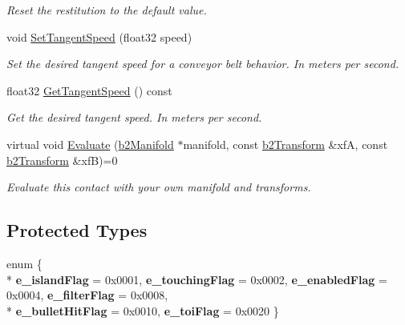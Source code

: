 \begin{DoxyCompactItemize}
\begin{DoxyCompactList}\small\item\em Reset the restitution to the default value. \end{DoxyCompactList}\item 
void \hyperlink{classb2_contact_a32033914a6c7f35b469e8fddbc17c566}{Set\+Tangent\+Speed} (float32 speed)\hypertarget{classb2_contact_a32033914a6c7f35b469e8fddbc17c566}{}\label{classb2_contact_a32033914a6c7f35b469e8fddbc17c566}

\begin{DoxyCompactList}\small\item\em Set the desired tangent speed for a conveyor belt behavior. In meters per second. \end{DoxyCompactList}\item 
float32 \hyperlink{classb2_contact_a961417ed0d43706ee8a39c396d5e6002}{Get\+Tangent\+Speed} () const \hypertarget{classb2_contact_a961417ed0d43706ee8a39c396d5e6002}{}\label{classb2_contact_a961417ed0d43706ee8a39c396d5e6002}

\begin{DoxyCompactList}\small\item\em Get the desired tangent speed. In meters per second. \end{DoxyCompactList}\item 
virtual void \hyperlink{classb2_contact_ae3c2842e5325b2d4500f8ed1d4de2f72}{Evaluate} (\hyperlink{structb2_manifold}{b2\+Manifold} $\ast$manifold, const \hyperlink{structb2_transform}{b2\+Transform} \&xfA, const \hyperlink{structb2_transform}{b2\+Transform} \&xfB)=0\hypertarget{classb2_contact_ae3c2842e5325b2d4500f8ed1d4de2f72}{}\label{classb2_contact_ae3c2842e5325b2d4500f8ed1d4de2f72}

\begin{DoxyCompactList}\small\item\em Evaluate this contact with your own manifold and transforms. \end{DoxyCompactList}\end{DoxyCompactItemize}
\subsection*{Protected Types}
\begin{DoxyCompactItemize}
\item 
enum \{ \\*
{\bfseries e\+\_\+island\+Flag} = 0x0001, 
{\bfseries e\+\_\+touching\+Flag} = 0x0002, 
{\bfseries e\+\_\+enabled\+Flag} = 0x0004, 
{\bfseries e\+\_\+filter\+Flag} = 0x0008, 
\\*
{\bfseries e\+\_\+bullet\+Hit\+Flag} = 0x0010, 
{\bfseries e\+\_\+toi\+Flag} = 0x0020
 \}\hypertarget{classb2_contact_ab8f00a9c04b3eea54a9c5bab29328c3e}{}\label{classb2_contact_ab8f00a9c04b3eea54a9c5bab29328c3e}

\end{DoxyCompactItemize}
